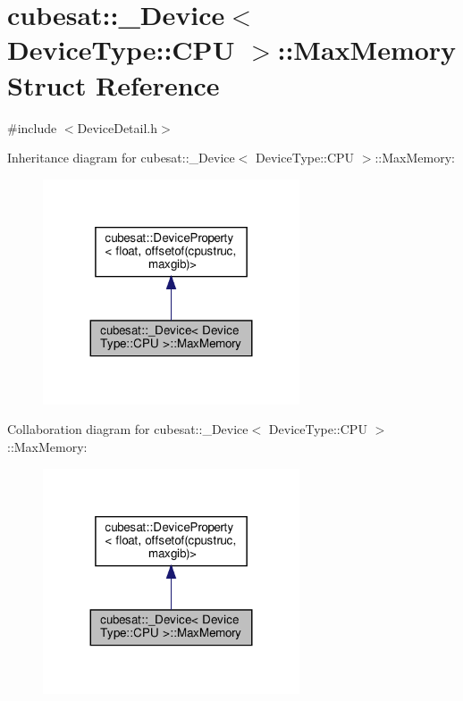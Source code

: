 \hypertarget{structcubesat_1_1__Device_3_01DeviceType_1_1CPU_01_4_1_1MaxMemory}{}\section{cubesat\+:\+:\+\_\+\+Device$<$ Device\+Type\+:\+:C\+PU $>$\+:\+:Max\+Memory Struct Reference}
\label{structcubesat_1_1__Device_3_01DeviceType_1_1CPU_01_4_1_1MaxMemory}


{\ttfamily \#include $<$Device\+Detail.\+h$>$}



Inheritance diagram for cubesat\+:\+:\+\_\+\+Device$<$ Device\+Type\+:\+:C\+PU $>$\+:\+:Max\+Memory\+:\nopagebreak
\begin{figure}[H]
\begin{center}
\leavevmode
\includegraphics[width=215pt]{structcubesat_1_1__Device_3_01DeviceType_1_1CPU_01_4_1_1MaxMemory__inherit__graph}
\end{center}
\end{figure}


Collaboration diagram for cubesat\+:\+:\+\_\+\+Device$<$ Device\+Type\+:\+:C\+PU $>$\+:\+:Max\+Memory\+:\nopagebreak
\begin{figure}[H]
\begin{center}
\leavevmode
\includegraphics[width=215pt]{structcubesat_1_1__Device_3_01DeviceType_1_1CPU_01_4_1_1MaxMemory__coll__graph}
\end{center}
\end{figure}
